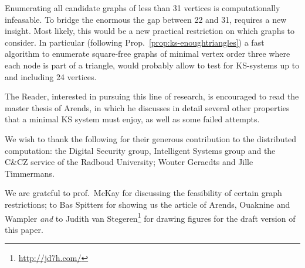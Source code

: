\documentclass{report}
\begin{document}
Enumerating all candidate graphs of less than 31 vertices
is computationally infeasable.
To bridge the enormous the gap between 22 and 31,
requires a new insight.
Most likely, this would be a new
practical restriction on which graphs to consider.
In particular
(following Prop.~\ref{prop:ks-enoughtriangles})
a fast algorithm to enumerate
square-free graphs of minimal vertex order three
where each node is part of a triangle,
would probably allow to test for KS-systems
up to and including 24 vertices.

The Reader, interested in pursuing this line of research,
is encouraged to read the master thesis\cite{a09} of Arends,
in which he discusses in detail several other
properties that a minimal KS system must enjoy, as well as
some failed attempts.

\begin{acknowledgment}
We wish to thank the following for their generous contribution to the
distributed computation:
    the Digital Security group, Intelligent Systems group
    and the C\&CZ service of the Radboud University;
    Wouter Geraedts and
    Jille Timmermans.

We are grateful to prof.~McKay for discussing the feasibility of
certain graph restrictions; to Bas Spitters for showing us the
article of Arends, Ouaknine and Wampler \emph{and} to Judith van
Stegeren\footnote{\url{http://jd7h.com/}} for drawing figures for
the draft version of this paper.
\end{acknowledgment}

\clearpage
{}

\end{document}
